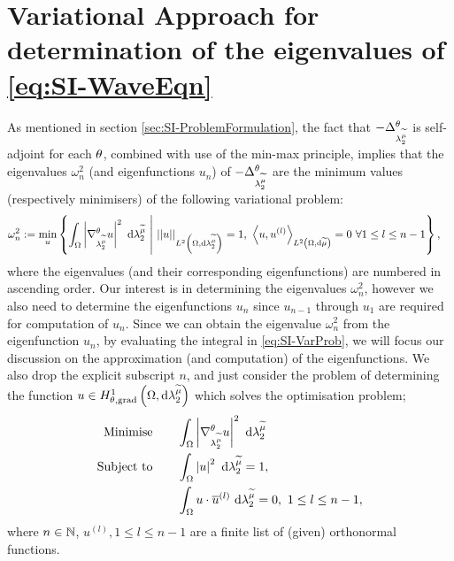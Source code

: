 \section{Variational Approach for determination of the eigenvalues of \eqref{eq:SI-WaveEqn}} \label{sec:SI-VarProbMethod}
As mentioned in section \ref{sec:SI-ProblemFormulation}, the fact that $-\Delta_{\lambda_2^{\widetilde{\mu}}}^\theta$ is self-adjoint for each $\theta$, combined with use of the min-max principle, implies that the eigenvalues $\omega_{n}^2$ (and eigenfunctions $u_n$) of $-\Delta_{\lambda_2^{\widetilde{\mu}}}^\theta$ are the minimum values (respectively minimisers) of the following variational problem:
\begin{align} \label{eq:SI-VarProb}
	\omega_n^2 &:= \min_{u}\clbracs{ \integral{\ddom}{ \abs{\tgrad_{\ccompMes}u}^2 }{\ccompMes} \setVert \norm{u}_{\ltwo{\ddom}{\ccompMes}}=1, \ \ip{u}{u^{(l)}}_{\ltwo{\ddom}{\dddmes}}=0 \ \forall 1\leq l\leq n-1 },
\end{align} 
where the eigenvalues (and their corresponding eigenfunctions) are numbered in ascending order.
Our interest is in determining the eigenvalues $\omega_n^2$, however we also need to determine the eigenfunctions $u_n$ since $u_{n-1}$ through $u_1$ are required for computation of $u_{n}$.
Since we can obtain the eigenvalue $\omega_n^2$ from the eigenfunction $u_n$, by evaluating the integral in \eqref{eq:SI-VarProb}, we will focus our discussion on the approximation (and computation) of the eigenfunctions.
We also drop the explicit subscript $n$, and just consider the problem of determining the function $u\in H^1_{\theta, \mathrm{grad}}\left( \Omega, \mathrm{d}\lambda_2^{\widetilde{\mu}} \right)$ which solves the optimisation problem;
\begin{subequations} \label{eq:SI-MinProblem}
	\begin{align}
		\text{Minimise} \quad & \quad \int_{\Omega} \left\lvert \nabla^{\theta}_{\lambda_2^{\widetilde{\mu}}}u \right\rvert^2  \ \mathrm{d}\lambda_2^{\widetilde{\mu}} \\
		\text{Subject to} \quad & \quad \int_{\Omega} \left\lvert u \right\rvert^2  \ \mathrm{d}\lambda_2^{\widetilde{\mu}} = 1, \\
		& \quad \int_{\Omega} u\cdot\overline{u}^{(l)}  \ \mathrm{d}\lambda_2^{\widetilde{\mu}} = 0, \ 1\leq l\leq n-1,
	\end{align}
\end{subequations}
where $n\in\mathbb{N}$, $u^{(l)}, 1\leq l\leq n-1$ are a finite list of (given) orthonormal functions.

